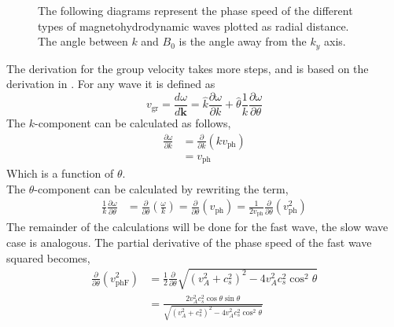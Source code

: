 \documentclass[a4paper]{article}
\numberwithin{figure}{section}
\numberwithin{equation}{section}
\begin{document}
\begin{figure}[h]
	\caption{The following diagrams represent the phase speed of the different types of magnetohydrodynamic waves plotted as radial distance. The angle between $k$ and $B_0$ is the angle away from the $k_y$ axis.}\label{fig:friedrich_diagrams}
\end{figure}

The derivation for the group velocity takes more steps, and is based on the derivation in \cite{Lyu2014}. For any wave it is defined as 
\begin{equation*}
    v_{\text{gr}} = \frac{d\omega}{d\mathbf{k}} = \hat{k}\frac{\partial\omega}{\partial k} + \hat{\theta} \frac{1}{k}\frac{\partial\omega}{\partial\theta}
\end{equation*}
The $k$-component can be calculated as follows,
\begin{align*}
    \frac{\partial \omega}{\partial k} &= \frac{\partial}{\partial k}\left(kv_{\text{ph}}\right)\\
    &= v_{\text{ph}}
\end{align*}
Which is a function of $\theta$.\\
The $\theta$-component can be calculated by rewriting the term,
\begin{align*}
    \frac{1}{k}\frac{\partial \omega}{\partial \theta} &= \frac{\partial}{\partial \theta}\left(\frac{\omega}{k}\right)
    = \frac{\partial}{\partial \theta}(v_{\text{ph}}) = \frac{1}{2v_{\text{ph}}} \frac{\partial}{\partial \theta}(v^2_{\text{ph}})
\end{align*}
The remainder of the calculations will be done for the fast wave, the slow wave case is analogous. The partial derivative of the phase speed of the fast wave squared becomes,
\begin{align*}
     \frac{\partial}{\partial \theta}(v^2_{\text{phF}})&= \frac{1}{2}\frac{\partial}{\partial \theta} \sqrt{(v_A^2 + c_s^2)^2 - 4v_A^2c_s^2\cos^2\theta}\\
     &= \frac{2v_A^2c_s^2\cos\theta\sin\theta}{\sqrt{(v_A^2 + c_s^2)^2 - 4v_A^2c_s^2\cos^2\theta}}
\end{align*}
\end{document}
